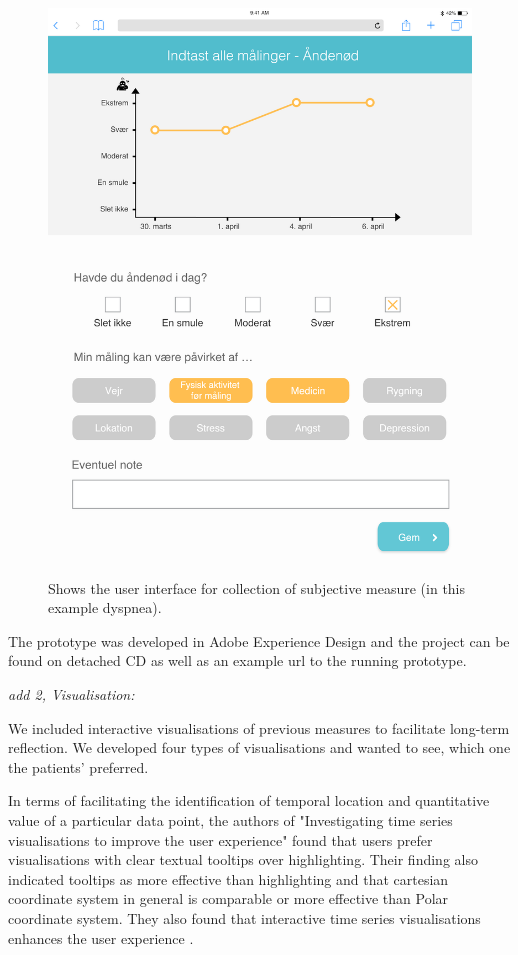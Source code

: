 \begin{figure}[h]
\begin{minipage}[b]{0.45\textwidth}
    \includegraphics[width=\textwidth]{images/study2/collectionSub.png}
    \caption{Shows the user interface for collection of subjective measure (in this example dyspnea).}
    \label{fig:colSubj}
  \end{minipage}
\end{figure}

The prototype was developed in Adobe Experience Design and the project can be found on detached CD as well as an example url to the running prototype.

\textit{add 2, Visualisation:}

We included interactive visualisations of previous measures to facilitate long-term reflection. We developed four types of visualisations and wanted to see, which one the patients' preferred. 

In terms of facilitating the identification of temporal location and quantitative value of a particular data point, the authors of "Investigating time series visualisations to improve the user experience" found that users prefer visualisations with clear textual tooltips over highlighting. Their finding also indicated tooltips as more effective than highlighting and that cartesian coordinate system in general is comparable or more effective than Polar coordinate system. They also found that interactive time series visualisations enhances the user experience \citep{adnan2016}.

